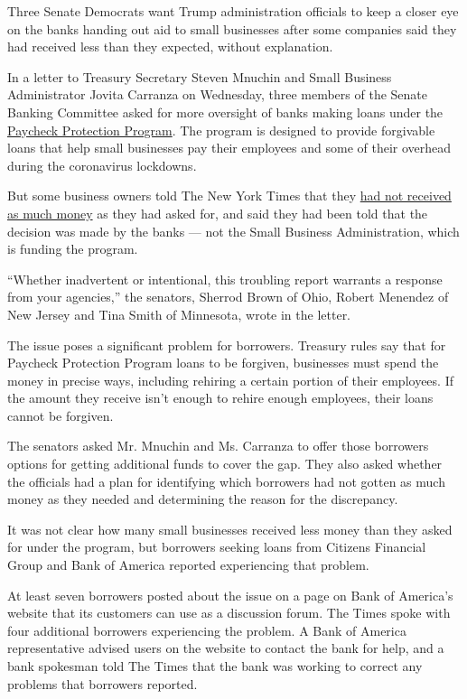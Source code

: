 Three Senate Democrats want Trump administration officials to keep a
closer eye on the banks handing out aid to small businesses after some
companies said they had received less than they expected, without
explanation.

In a letter to Treasury Secretary Steven Mnuchin and Small Business
Administrator Jovita Carranza on Wednesday, three members of the Senate
Banking Committee asked for more oversight of banks making loans under
the
\href{https://www.nytimes3xbfgragh.onion/2020/06/10/business/Small-business-loans-ppp.html}{Paycheck
Protection Program}. The program is designed to provide forgivable loans
that help small businesses pay their employees and some of their
overhead during the coronavirus lockdowns.

But some business owners told The New York Times that they
\href{https://www.nytimes3xbfgragh.onion/2020/05/11/business/coronavirus-aid-banks.html}{had
not received as much money} as they had asked for, and said they had
been told that the decision was made by the banks --- not the Small
Business Administration, which is funding the program.

``Whether inadvertent or intentional, this troubling report warrants a
response from your agencies,'' the senators, Sherrod Brown of Ohio,
Robert Menendez of New Jersey and Tina Smith of Minnesota, wrote in the
letter.

The issue poses a significant problem for borrowers. Treasury rules say
that for Paycheck Protection Program loans to be forgiven, businesses
must spend the money in precise ways, including rehiring a certain
portion of their employees. If the amount they receive isn't enough to
rehire enough employees, their loans cannot be forgiven.

The senators asked Mr. Mnuchin and Ms. Carranza to offer those borrowers
options for getting additional funds to cover the gap. They also asked
whether the officials had a plan for identifying which borrowers had not
gotten as much money as they needed and determining the reason for the
discrepancy.

It was not clear how many small businesses received less money than they
asked for under the program, but borrowers seeking loans from Citizens
Financial Group and Bank of America reported experiencing that problem.

At least seven borrowers posted about the issue on a page on Bank of
America's website that its customers can use as a discussion forum. The
Times spoke with four additional borrowers experiencing the problem. A
Bank of America representative advised users on the website to contact
the bank for help, and a bank spokesman told The Times that the bank was
working to correct any problems that borrowers reported.

